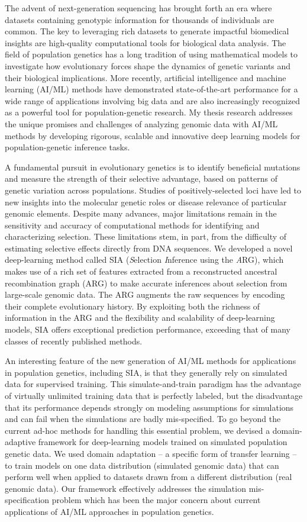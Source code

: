 The advent of next-generation sequencing has brought forth an era where datasets containing genotypic information for thousands of individuals are common. The key to leveraging rich datasets to generate impactful biomedical insights are high-quality computational tools for biological data analysis. The field of population genetics has a long tradition of using mathematical models to investigate how evolutionary forces shape the dynamics of genetic variants and their biological implications. More recently, artificial intelligence and machine learning (AI/ML) methods have demonstrated state-of-the-art performance for a wide range of applications involving big data and are also increasingly recognized as a powerful tool for population-genetic research. My thesis research addresses the unique promises and challenges of analyzing genomic data with AI/ML methods by developing rigorous, scalable and innovative deep learning models for population-genetic inference tasks.

A fundamental pursuit in evolutionary genetics is to identify beneficial mutations and measure the strength of their selective advantage, based on patterns of genetic variation across populations. Studies of positively-selected loci have led to new insights into the molecular genetic roles or disease relevance of particular genomic elements. Despite many advances, major limitations remain in the sensitivity and accuracy of computational methods for identifying and characterizing selection. These limitations stem, in part, from the difficulty of estimating selective effects directly from DNA sequences. We developed a novel deep-learning method called SIA (\textit{S}election \textit{I}nference using the \textit{A}RG), which makes use of a rich set of features extracted from a reconstructed ancestral recombination graph (ARG) to make accurate inferences about selection from large-scale genomic data. The ARG augments the raw sequences by encoding their complete evolutionary history. By exploiting both the richness of information in the ARG and the flexibility and scalability of deep-learning models, SIA offers exceptional prediction performance, exceeding that of many classes of recently published methods.

An interesting feature of the new generation of AI/ML methods for applications in population genetics, including SIA, is that they generally rely on simulated data for supervised training. This simulate-and-train paradigm has the advantage of virtually unlimited training data that is perfectly labeled, but the disadvantage that its performance depends strongly on modeling assumptions for simulations and can fail when the simulations are badly mis-specified. To go beyond the current ad-hoc methods for handling this essential problem, we devised a domain-adaptive framework for deep-learning models trained on simulated population genetic data. We used domain adaptation – a specific form of transfer learning – to train models on one data distribution (simulated genomic data) that can perform well when applied to datasets drawn from a different distribution (real genomic data). Our framework effectively addresses the simulation mis-specification problem which has been the major concern about current applications of AI/ML approaches in population genetics.

